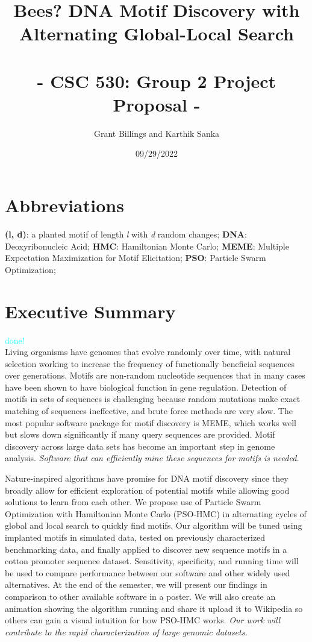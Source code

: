 \documentclass{article}
\title{%
	\Large Bees? DNA Motif Discovery with Alternating Global-Local Search  \\
	\large \; \\ - CSC 530: Group 2 Project Proposal -}
\author{Grant Billings and Karthik Sanka}
\date{09/29/2022}
\begin{document}
\maketitle
\section*{\large{Abbreviations}}
\textbf{(l, d)}: a planted motif of length \textit{l} with \textit{d} random changes; \textbf{DNA}: Deoxyribonucleic Acid; \textbf{HMC}: Hamiltonian Monte Carlo; \textbf{MEME}: Multiple Expectation Maximization for Motif Elicitation; \textbf{PSO}: Particle Swarm Optimization;
\section{Executive Summary}
\textcolor{cyan}{done!} \\
Living organisms have genomes that evolve randomly over time, with natural selection working to increase the frequency of functionally beneficial sequences over generations. Motifs are non-random nucleotide sequences that in many cases have been shown to have biological function in gene regulation. Detection of motifs in sets of sequences is challenging because random mutations make exact matching of sequences ineffective, and brute force methods are very slow. The most popular software package for motif discovery is MEME, which works well but slows down significantly if many query sequences are provided. Motif discovery across large data sets has become an important step in genome analysis. \textit{Software that can efficiently mine these sequences for motifs is needed.}  
  
Nature-inspired algorithms have promise for DNA motif discovery since they broadly allow for efficient exploration of potential motifs while allowing good solutions to learn from each other. We propose use of Particle Swarm Optimization with Hamiltonian Monte Carlo (PSO-HMC) in alternating cycles of global and local search to quickly find motifs. Our algorithm will be tuned using implanted motifs in simulated data, tested on previously characterized benchmarking data, and finally applied to discover new sequence motifs in a cotton promoter sequence dataset. Sensitivity, specificity, and running time will be used to compare performance between our software and other widely used alternatives. At the end of the semester, we will present our findings in comparison to other available software in a poster. We will also create an animation showing the algorithm running and share it upload it to Wikipedia so others can gain a visual intuition for how PSO-HMC works. \textit{Our work will contribute to the rapid characterization of large genomic datasets.}
\end{document}
